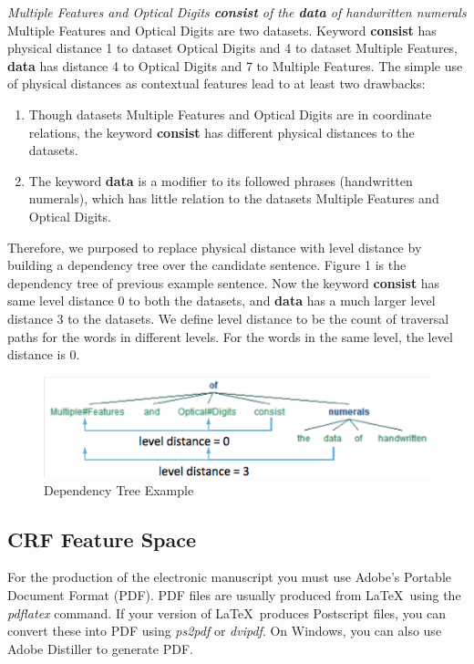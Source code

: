 \documentclass[11pt]{article}
\begin{document}
\textit{Multiple Features and Optical Digits \textbf{consist} of the \textbf{data} of handwritten numerals} \\

Multiple Features and Optical Digits are two datasets. Keyword \textbf{consist} has physical distance 1 to dataset Optical Digits and 4 to dataset Multiple Features, \textbf{data} has distance 4 to Optical Digits and 7 to Multiple Features. The simple use of physical distances as contextual features lead to at least two drawbacks:
\begin{enumerate}
\item Though datasets Multiple Features and Optical Digits are in coordinate relations, the keyword \textbf{consist} has different physical distances to the datasets.
\item The keyword \textbf{data} is a modifier to its followed phrases (handwritten numerals), which has little relation to the datasets Multiple Features and Optical Digits. 
\end{enumerate}
Therefore, we purposed to replace physical distance with level distance by building a dependency tree over the candidate sentence. Figure 1 is the dependency tree of previous example sentence. Now the keyword \textbf{consist} has same level distance 0 to both the datasets, and \textbf{data} has a much larger level distance 3 to the datasets. We define level distance to be the count of traversal paths for the words in different levels. For the words in the same level, the level distance is 0.

\begin{figure}[t]\centering
\includegraphics[width=1.05\linewidth]{figures/level-distance.png}
\caption{Dependency Tree Example}
\vspace{-0.3cm}
\label{fig:view}
\end{figure}

\subsection{CRF Feature Space}
\label{sect:pdf}

For the production of the electronic manuscript you must use Adobe's
Portable Document Format (PDF). PDF files are usually produced from
\LaTeX\ using the \textit{pdflatex} command. If your version of
\LaTeX\ produces Postscript files, you can convert these into PDF
using \textit{ps2pdf} or \textit{dvipdf}. On Windows, you can also use
Adobe Distiller to generate PDF.
\end{document}
